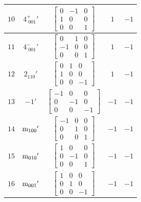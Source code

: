\documentclass[fleqn,8pt]{jsarticle}
\begin{document}
\begin{longtable}{ccccc}
$ 10 $ & $ 4^{+}_{\,\,001}{}' $ & $ \begin{bmatrix} 0 & -1 & 0 \\ 1 & 0 & 0 \\ 0 & 0 & 1 \end{bmatrix} $ & $ 1 $ & $ -1 $ \\ \hline
$ 11 $ & $ 4^{-}_{\,\,001}{}' $ & $ \begin{bmatrix} 0 & 1 & 0 \\ -1 & 0 & 0 \\ 0 & 0 & 1 \end{bmatrix} $ & $ 1 $ & $ -1 $ \\ \hline
$ 12 $ & $ 2{}_{110}{}' $ & $ \begin{bmatrix} 0 & 1 & 0 \\ 1 & 0 & 0 \\ 0 & 0 & -1 \end{bmatrix} $ & $ 1 $ & $ -1 $ \\ \hline
$ 13 $ & $ -1{}' $ & $ \begin{bmatrix} -1 & 0 & 0 \\ 0 & -1 & 0 \\ 0 & 0 & -1 \end{bmatrix} $ & $ -1 $ & $ -1 $ \\ \hline
$ 14 $ & $ {\rm m}_{100}{}' $ & $ \begin{bmatrix} -1 & 0 & 0 \\ 0 & 1 & 0 \\ 0 & 0 & 1 \end{bmatrix} $ & $ -1 $ & $ -1 $ \\ \hline
$ 15 $ & $ {\rm m}_{010}{}' $ & $ \begin{bmatrix} 1 & 0 & 0 \\ 0 & -1 & 0 \\ 0 & 0 & 1 \end{bmatrix} $ & $ -1 $ & $ -1 $ \\ \hline
$ 16 $ & $ {\rm m}_{001}{}' $ & $ \begin{bmatrix} 1 & 0 & 0 \\ 0 & 1 & 0 \\ 0 & 0 & -1 \end{bmatrix} $ & $ -1 $ & $ -1 $ \\
\end{longtable}
\end{document}
